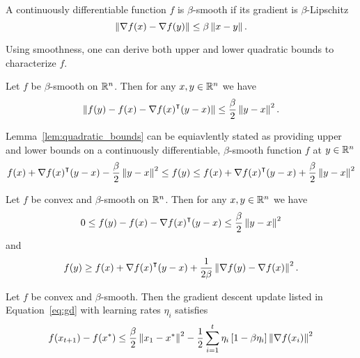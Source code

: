\begin{definition}
    A continuously differentiable function $f$ is $\beta$-smooth if its gradient
    is $\beta$-Lipschitz
    \begin{equation}
        \left\| \nabla f(x) - \nabla f(y) \right\| \leq \beta \left\| x - y \right\|.
    \end{equation}
\end{definition}

Using smoothness, one can derive both upper and lower quadratic bounds to
characterize $f$. 

\begin{lemma}
    \label{lem:quadratic_bounds}
    Let $f$ be $\beta$-smooth on $\mathbb R^n$. Then for any $x, y \in \mathbb R^n$ we have 
    \begin{equation}
        \left\| f(y) - f(x) - \nabla {f(x)}^\intercal(y - x) \right\| \leq \frac{\beta}{2}
        \left\| y - x \right\|^2.
    \end{equation}
\end{lemma}

Lemma~\ref{lem:quadratic_bounds} can be equiavlently stated as providing upper
and lower bounds on a continuously differentiable, $\beta$-smooth function $f$
at $y \in \mathbb R^n$
\begin{equation}
    f(x) + \nabla {f(x)}^\intercal(y - x) - \frac{\beta}{2} \left\| y - x \right\|^2 \leq
    f(y) \leq
    f(x) + \nabla {f(x)}^\intercal(y - x) + \frac{\beta}{2} \left\| y - x \right\|^2
\end{equation}

\begin{lemma}
    \label{lem:con_smo}
    Let $f$ be convex and $\beta$-smooth on $\mathbb R^n$. Then for any $x, y \in \mathbb R^n$ we have
    \begin{equation}
        \label{eq:lem4_1}
        0 \leq f(y) - f(x) - \nabla {f(x)}^\intercal (y - x) \leq
        \frac{\beta}{2} \left\| y - x \right\|^2
    \end{equation}
    and
    \begin{equation}
        \label{eq:lem4_2}
        f(y) \geq f(x) + \nabla {f(x)}^\intercal (y - x) + \frac{1}{2\beta}
        \left\| \nabla f(y) - \nabla f(x) \right\|^2.
    \end{equation}
\end{lemma}

\begin{theorem}
    Let $f$ be convex and $\beta$-smooth. Then the
    gradient descent update listed in Equation~\ref{eq:gd} with learning rates
    $\eta_i$ satisfies
    \begin{equation}
        f(x_{t+1}) - f(x^*) \leq \frac{\beta}{2}\left\| x_1 - x^* \right\|^2 - \frac 1 2\sum_{i =
        1}^{t}  \eta_i\left[1 - \beta\eta_i\right] \left\| \nabla f(x_i) \right\|^2
    \end{equation}
\end{theorem}


